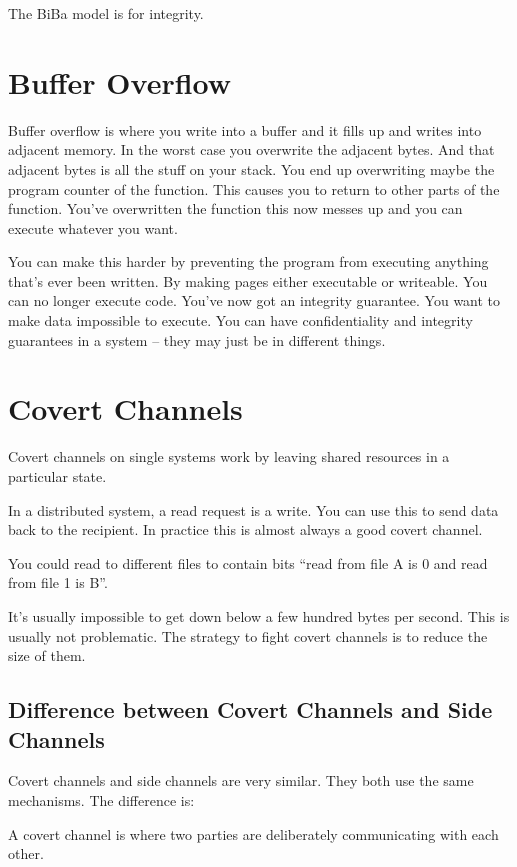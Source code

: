 \documentclass[10pt, a4paper]{article}
\begin{document}
The BiBa model is for integrity.

\section{Buffer Overflow}

Buffer overflow is where you write into a buffer and it fills up and writes into
adjacent memory. In the worst case you overwrite the adjacent bytes. And that adjacent bytes is
all the stuff on your stack. You end up overwriting maybe the program counter of the function. This causes
you to return to other parts of the function. You've overwritten the function this now messes up and you can execute
whatever you want.

You can make this harder by preventing the program from executing anything that's ever been written.
By making pages either executable or writeable. You can no longer execute code. You've now got an
integrity guarantee. You want to make data impossible to execute. You can have confidentiality and integrity
guarantees in a system -- they may just be in different things.

\section{Covert Channels}

Covert channels on single systems work by leaving shared resources in a particular state.

In a distributed system, a read request is a write. You can use this to send data
back to the recipient. In practice this is almost always a good covert channel.

You could read to different files to contain bits ``read from file A is 0 and read from file 1 is B''.

It's usually impossible to get down below a few hundred bytes per second. This is usually not problematic.
The strategy to fight covert channels is to reduce the size of them.

\subsection{Difference between Covert Channels and Side Channels}

Covert channels and side channels are very similar. They both use the same mechanisms. The difference is:

A covert channel is where two parties are deliberately communicating with each other.
\end{document}
